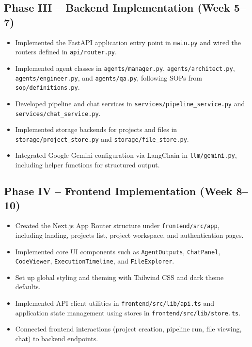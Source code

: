 \subsection*{Phase III -- Backend Implementation (Week 5--7)}
\begin{itemize}
    \item Implemented the FastAPI application entry point in \texttt{main.py} and wired the routers defined in \texttt{api/\allowbreak{}\allowbreak{}router.py}.
    \item Implemented agent classes in \texttt{agents/\allowbreak{}\allowbreak{}manager.py}, \texttt{agents/\allowbreak{}\allowbreak{}architect.py}, \texttt{agents/\allowbreak{}\allowbreak{}engineer.py}, and \texttt{agents/\allowbreak{}\allowbreak{}qa.py}, following SOPs from \texttt{sop/\allowbreak{}\allowbreak{}definitions.py}.
    \item Developed pipeline and chat services in \texttt{services/\allowbreak{}\allowbreak{}pipeline\_\allowbreak{}service.py} and \texttt{services/\allowbreak{}\allowbreak{}chat\_\allowbreak{}service.py}.
    \item Implemented storage backends for projects and files in \texttt{storage/\allowbreak{}\allowbreak{}project\_\allowbreak{}store.py} and \texttt{storage/\allowbreak{}\allowbreak{}file\_\allowbreak{}store.py}.
    \item Integrated Google Gemini configuration via LangChain in \texttt{llm/\allowbreak{}\allowbreak{}gemini.py}, including helper functions for structured output.
\end{itemize}

\subsection*{Phase IV -- Frontend Implementation (Week 8--10)}
\begin{itemize}
    \item Created the Next.js App Router structure under \texttt{frontend/\allowbreak{}\allowbreak{}src/\allowbreak{}app}, including landing, projects list, project workspace, and authentication pages.
    \item Implemented core UI components such as \texttt{AgentOutputs}, \texttt{ChatPanel}, \texttt{CodeViewer}, \texttt{ExecutionTimeline}, and \texttt{FileExplorer}.
    \item Set up global styling and theming with Tailwind CSS and dark theme defaults.
    \item Implemented API client utilities in \texttt{frontend/\allowbreak{}\allowbreak{}src/\allowbreak{}lib/\allowbreak{}api.ts} and application state management using stores in \texttt{frontend/\allowbreak{}\allowbreak{}src/\allowbreak{}lib/\allowbreak{}store.ts}.
    \item Connected frontend interactions (project creation, pipeline run, file viewing, chat) to backend endpoints.
\end{itemize}

